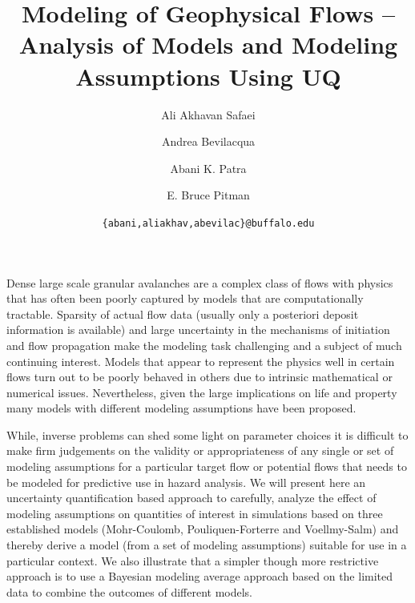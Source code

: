 \documentclass{article}
\begin{document}
\title{\bf Modeling of Geophysical Flows -- Analysis of Models and Modeling Assumptions Using UQ}
\author[1]{ Ali Akhavan Safaei}
\author[2]{Andrea Bevilacqua}
\author[1,3]{Abani K. Patra}
\author[4]{E. Bruce Pitman}


\date{\texttt{\{abani,aliakhav,abevilac\}@buffalo.edu}}


\maketitle

\abstract
Dense large scale granular avalanches are a complex class of flows with physics that has often been poorly captured by models that are computationally tractable. Sparsity of actual flow data (usually only a posteriori  deposit information is available) and large uncertainty in the mechanisms of initiation and flow propagation make the modeling task challenging and a
subject of much continuing interest. Models that appear to represent the physics well
 in certain flows turn out to be poorly behaved in others due to intrinsic mathematical or numerical issues.
Nevertheless, given the large implications on life and property many models with different modeling assumptions have been proposed.

While, inverse problems can shed some light on parameter choices it is difficult to make firm judgements on the validity or appropriateness of any single or set of modeling assumptions for a particular target flow or potential flows that needs to be modeled for predictive use in hazard analysis. We will present here an uncertainty quantification  based approach to carefully, analyze the effect of modeling assumptions on quantities of
interest in simulations based on three established models (Mohr-Coulomb, Pouliquen-Forterre and Voellmy-Salm) and thereby derive a model (from a set of modeling assumptions) suitable for use in a particular context. We also illustrate that a simpler though more restrictive approach is to use a Bayesian modeling average approach based on the limited data to combine the outcomes of different models.

\newpage
\end{document}
